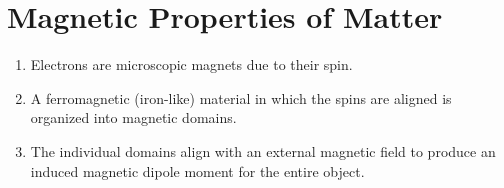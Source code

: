 \documentclass{article}
\begin{document}
\section*{Magnetic Properties of Matter}
\begin{enumerate}
    \item Electrons are microscopic magnets due to their spin.
    \item A ferromagnetic (iron-like) material in which the spins are aligned is organized into
    magnetic domains.
    \item The individual domains align with an external magnetic field to produce an induced
    magnetic dipole moment for the entire object.
\end{enumerate}
\end{document}
